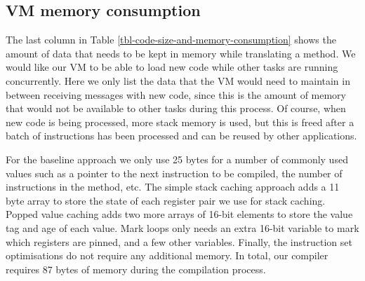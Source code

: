 \subsection{VM memory consumption} The last column in Table \ref{tbl-code-size-and-memory-consumption} shows the amount of data that needs to be kept in memory while translating a method. We would like our VM to be able to load new code while other tasks are running concurrently. Here we only list the data that the VM would need to maintain in between receiving messages with new code, since this is the amount of memory that would not be available to other tasks during this process. Of course, when new code is being processed, more stack memory is used, but this is freed after a batch of instructions has been processed and can be reused by other applications.

For the baseline approach we only use 25 bytes for a number of commonly used values such as a pointer to the next instruction to be compiled, the number of instructions in the method, etc. The simple stack caching approach adds a 11 byte array to store the state of each register pair we use for stack caching. Popped value caching adds two more arrays of 16-bit elements to store the value tag and age of each value. Mark loops only needs an extra 16-bit variable to mark which registers are pinned, and a few other variables. Finally, the instruction set optimisations do not require any additional memory. In total, our compiler requires 87 bytes of memory during the compilation process.

